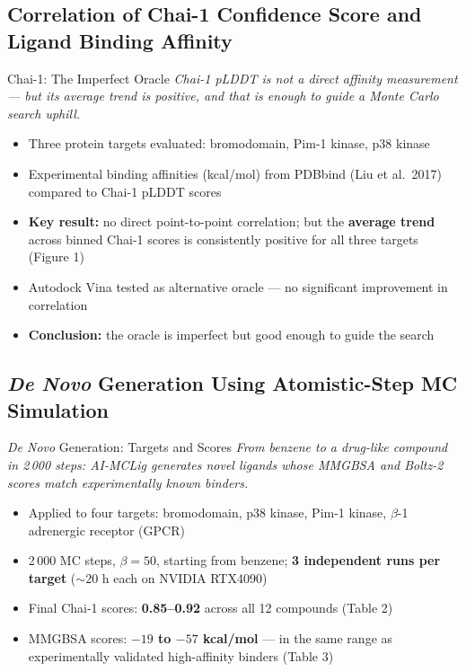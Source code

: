 \documentclass{beamer}
\begin{document}
\subsection{Correlation of Chai-1 Confidence Score and Ligand Binding Affinity}

\begin{frame}{Chai-1: The Imperfect Oracle}
  \textit{Chai-1 pLDDT is not a direct affinity measurement --- but its average trend is positive, and that is enough to guide a Monte Carlo search uphill.}

  \vspace{0.6em}
  \begin{itemize}
    \item Three protein targets evaluated: bromodomain, Pim-1 kinase, p38 kinase
    \item Experimental binding affinities (kcal/mol) from PDBbind (Liu et al.\ 2017) compared to Chai-1 pLDDT scores
    \item \textbf{Key result:} no direct point-to-point correlation; but the \textbf{average trend} across binned Chai-1 scores is consistently positive for all three targets (Figure 1)
    \item Autodock Vina tested as alternative oracle --- no significant improvement in correlation
    \item \textbf{Conclusion:} the oracle is imperfect but good enough to guide the search
  \end{itemize}
\end{frame}

\subsection{\textit{De Novo} Generation Using Atomistic-Step MC Simulation}

\begin{frame}{\textit{De Novo} Generation: Targets and Scores}
  \textit{From benzene to a drug-like compound in 2\,000 steps: AI-MCLig generates novel ligands whose MMGBSA and Boltz-2 scores match experimentally known binders.}

  \vspace{0.6em}
  \begin{itemize}
    \item Applied to four targets: bromodomain, p38 kinase, Pim-1 kinase, $\beta$-1 adrenergic receptor (GPCR)
    \item 2\,000 MC steps, $\beta = 50$, starting from benzene; \textbf{3 independent runs per target} (${\sim}20$ h each on NVIDIA RTX4090)
    \item Final Chai-1 scores: \textbf{0.85--0.92} across all 12 compounds (Table 2)
    \item MMGBSA scores: \textbf{$-19$ to $-57$ kcal/mol} --- in the same range as experimentally validated high-affinity binders (Table 3)
  \end{itemize}
\end{frame}
\end{document}
